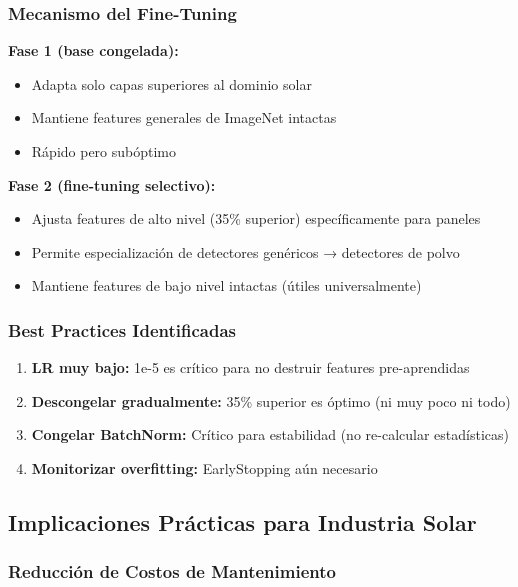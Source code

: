 \documentclass[11pt, a4paper]{article}
\begin{document}
\subsubsection{Mecanismo del Fine-Tuning}

\textbf{Fase 1 (base congelada):}
\begin{itemize}
    \item Adapta solo capas superiores al dominio solar
    \item Mantiene features generales de ImageNet intactas
    \item Rápido pero subóptimo
\end{itemize}

\textbf{Fase 2 (fine-tuning selectivo):}
\begin{itemize}
    \item Ajusta features de alto nivel (35\% superior) específicamente para paneles
    \item Permite especialización de detectores genéricos → detectores de polvo
    \item Mantiene features de bajo nivel intactas (útiles universalmente)
\end{itemize}

\subsubsection{Best Practices Identificadas}

\begin{enumerate}
    \item \textbf{LR muy bajo:} 1e-5 es crítico para no destruir features pre-aprendidas
    \item \textbf{Descongelar gradualmente:} 35\% superior es óptimo (ni muy poco ni todo)
    \item \textbf{Congelar BatchNorm:} Crítico para estabilidad (no re-calcular estadísticas)
    \item \textbf{Monitorizar overfitting:} EarlyStopping aún necesario
\end{enumerate}

\subsection{Implicaciones Prácticas para Industria Solar}

\subsubsection{Reducción de Costos de Mantenimiento}
\end{document}
